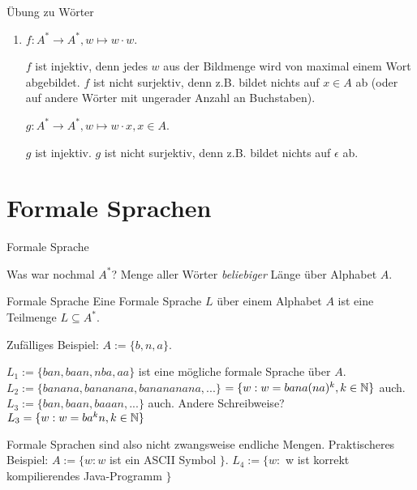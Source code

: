 \documentclass[]{beamer}
\begin{document}
\begin{frame}{Übung zu Wörter}
	\begin{enumerate}
		\item $f: A^* \rightarrow A^*, w \mapsto w \cdot w$.
		\begin{itemize}
			\pitem $f$ ist injektiv\pause , denn jedes $w$ aus der Bildmenge wird von maximal einem Wort abgebildet.
			\pitem $f$ ist nicht surjektiv\pause , denn z.B. bildet nichts auf $x \in A$ ab (oder auf andere Wörter mit ungerader Anzahl an Buchstaben).
		\end{itemize}
		\pitem $g: A^* \rightarrow A^*, w \mapsto w \cdot x, x \in A$.
		\begin{itemize}
			\pitem $g$ ist injektiv.
			\pitem $g$ ist nicht surjektiv\pause , denn z.B. bildet nichts auf $\epsilon$ ab.
		\end{itemize}
	\end{enumerate}
\end{frame}

\section{Formale Sprachen}

\begin{frame}{Formale Sprache}
	\begin{itemize}
		\pitem Was war nochmal $A^*$? Menge aller Wörter \emph{beliebiger} Länge über Alphabet $A$.
	\end{itemize}

	\pause
	
	\begin{block}{Formale Sprache}
		Eine Formale Sprache $L$ über einem Alphabet $A$ ist eine Teilmenge $L \subseteq A^*$.
	\end{block}

	\begin{itemize}
		\pitem Zufälliges Beispiel: \pause $A := \{b, n, a\}$.
		\begin{itemize}
			\pitem $L_1 := \{ban, baan, nba, aa\}$ ist eine mögliche formale Sprache über $A$.
			\pitem $L_2 := \{banana, bananana, banananana, ...\}$ \pause $ = \{w : w = bana(na)^k, k \in \mathbb{N}\}$ auch.
			\pitem $L_3 := \{ban, baan, baaan, ...\}$ auch. \pause Andere Schreibweise? \pause \\ $ L_3 = \{w : w = ba^kn, k \in \mathbb{N} \}$
		\end{itemize}
		\pitem Formale Sprachen sind also nicht zwangsweise endliche Mengen.
		\pitem Praktischeres Beispiel: $A := \{w : w $ ist ein ASCII Symbol $\}$.
		\pitem $L_4 := \{w : $ w ist korrekt kompilierendes Java-Programm $\}$ 
	\end{itemize}
\end{frame}
\end{document}
